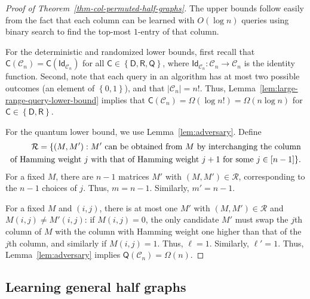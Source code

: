 \documentclass[11pt]{article}
\newcommand{\cC}{\mathcal{C}}
\newcommand{\cR}{\mathcal{R}}
\newcommand{\sC}{\mathsf{C}}
\newcommand{\sD}{\mathsf{D}}
\newcommand{\sQ}{\mathsf{Q}}
\newcommand{\sR}{\mathsf{R}}
\newcommand{\set}[1]{\left\{ #1 \right\}}
\newcommand{\cbra}[1]{\left\{#1\right\}}
\newcommand{\zone}{\set{0,1}}
\begin{document}
\begin{proof}[Proof of Theorem~\ref{thm-col-permuted-half-graphs}]
The upper bounds follow easily from the fact that each column can be learned with $O(\log n)$ queries using binary search to find the top-most $1$-entry of that column.

For the deterministic and randomized lower bounds, first recall that $\sC(\cC_n) = \sC(\mathsf{Id}_{\cC_n})$ for all $\sC \in \cbra{\sD, \sR, \sQ}$, where $\mathsf{Id}_{\cC_n} : \cC_n \to \cC_n$ is the identity function.
%
Second, note that each query in an algorithm has at most two possible outcomes (an element of $\zone$), and that $|\cC_n| = n!$. Thus, Lemma~\ref{lem:large-range-query-lower-bound} implies that $\sC(\cC_n) = \Omega(\log n!) = \Omega(n \log n)$ for $\sC \in \cbra{\sD, \sR}$.

For the quantum lower bound, we use Lemma~\ref{lem:adversary}. Define
\begin{align*}
    \cR = \{(M, M') : M' \textnormal{ can be obtained from } M \textnormal{ by interchanging the column}\\
    \textnormal{of Hamming weight } j \textnormal{ with that of Hamming weight } j + 1 \textnormal{ for some } j \in [n - 1]\}.
\end{align*}
For a fixed $M$, there are $n-1$ matrices $M'$ with $(M,M')\in\cR$, corresponding to the $n-1$ choices of $j$. Thus, $m=n-1$. Similarly, $m'=n-1$.

For a fixed $M$ and $(i,j)$, there is at most one $M'$ with $(M,M') \in \cR$ and $M(i,j) \neq M'(i,j)$: if $M(i,j)=0$, the only candidate $M'$ must swap the $j$th column of $M$ with the column with Hamming weight one higher than that of the $j$th column, and similarly if $M(i,j)=1$. Thus, $\ell=1$. Similarly, $\ell'=1$. Thus, Lemma~\ref{lem:adversary} implies $\sQ(\cC_n) = \Omega(n)$.
\end{proof}



\subsection{Learning general half graphs}\label{subsec:row-column-permuted-half-graph-learning}
\end{document}
